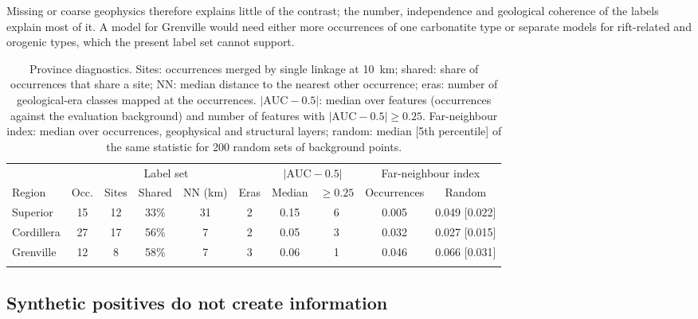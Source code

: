 \documentclass[pdflatex,sn-apa]{sn-jnl}
\begin{document}
Missing or coarse geophysics therefore explains little of the contrast; the number, independence and geological coherence of the labels explain most of it. A model for Grenville would need either more occurrences of one carbonatite type or separate models for rift-related and orogenic types, which the present label set cannot support.

\begin{table}[t]
\caption{Province diagnostics. Sites: occurrences merged by single linkage at 10~km; shared: share of occurrences that share a site; NN: median distance to the nearest other occurrence; eras: number of geological-era classes mapped at the occurrences. $|\mathrm{AUC}-0.5|$: median over features (occurrences against the evaluation background) and number of features with $|\mathrm{AUC}-0.5| \geq 0.25$. Far-neighbour index: median over occurrences, geophysical and structural layers; random: median [5th percentile] of the same statistic for 200 random sets of background points.}\label{tab:region-diag}
\scriptsize
\setlength{\tabcolsep}{2.5pt}
\begin{tabular*}{\textwidth}{@{\extracolsep\fill}lccccccccc}
\toprule
 & \multicolumn{5}{c}{Label set} & \multicolumn{2}{c}{$|\mathrm{AUC}-0.5|$} & \multicolumn{2}{c}{Far-neighbour index} \\
\cmidrule(lr){2-6}\cmidrule(lr){7-8}\cmidrule(lr){9-10}
Region & Occ. & Sites & Shared & NN (km) & Eras & Median & $\geq 0.25$ & Occurrences & Random \\
\midrule
Superior & 15 & 12 & 33\% & 31 & 2 & 0.15 & 6 & 0.005 & 0.049 [0.022] \\
Cordillera & 27 & 17 & 56\% & 7 & 2 & 0.05 & 3 & 0.032 & 0.027 [0.015] \\
Grenville & 12 & 8 & 58\% & 7 & 3 & 0.06 & 1 & 0.046 & 0.066 [0.031] \\
\botrule
\end{tabular*}
\end{table}

\subsection{Synthetic positives do not create information}\label{sec:disc-gan}
\end{document}
